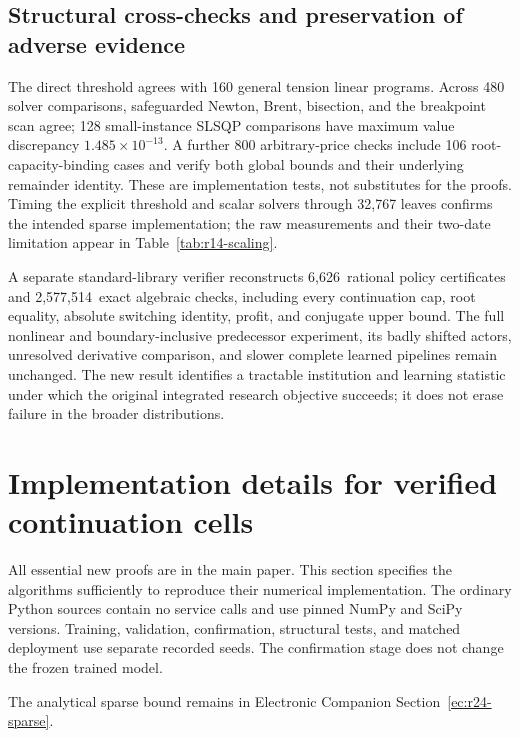 \documentclass[11pt,letterpaper]{article}
\theoremstyle{definition}
\newcommand{\1}{\mathbf 1}
\newcommand{\RFourteenDenseError}{$1.485\times10^{-13}$}
\newcommand{\RFourteenCertificates}{6,626}
\newcommand{\RFourteenChecks}{2,577,514}
\begin{document}
\subsection{Structural cross-checks and preservation of adverse evidence}
The direct threshold agrees with 160 general tension linear programs. Across 480 solver comparisons, safeguarded Newton, Brent, bisection, and the breakpoint scan agree; 128 small-instance SLSQP comparisons have maximum value discrepancy \RFourteenDenseError. A further 800 arbitrary-price checks include 106 root-capacity-binding cases and verify both global bounds and their underlying remainder identity. These are implementation tests, not substitutes for the proofs. Timing the explicit threshold and scalar solvers through 32,767 leaves confirms the intended sparse implementation; the raw measurements and their two-date limitation appear in Table~\ref{tab:r14-scaling}.

A separate standard-library verifier reconstructs \RFourteenCertificates\ rational policy certificates and \RFourteenChecks\ exact algebraic checks, including every continuation cap, root equality, absolute switching identity, profit, and conjugate upper bound. The full nonlinear and boundary-inclusive predecessor experiment, its badly shifted actors, unresolved derivative comparison, and slower complete learned pipelines remain unchanged. The new result identifies a tractable institution and learning statistic under which the original integrated research objective succeeds; it does not erase failure in the broader distributions.




\section{Implementation details for verified continuation cells}\label{ec:r13-implementation}
All essential new proofs are in the main paper. This section specifies the algorithms sufficiently to reproduce their numerical implementation. The ordinary Python sources contain no service calls and use pinned NumPy and SciPy versions. Training, validation, confirmation, structural tests, and matched deployment use separate recorded seeds. The confirmation stage does not change the frozen trained model.

The analytical sparse bound remains in Electronic Companion Section~\ref{ec:r24-sparse}.
\end{document}
